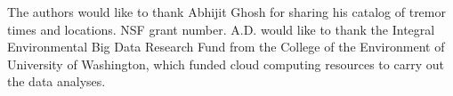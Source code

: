 \documentclass[draft]{agujournal2019}
\begin{document}
%
%
%
%
%
%
%
%


\acknowledgments
The authors would like to thank Abhijit Ghosh for sharing his catalog of tremor times and locations. NSF grant number. A.D. would like to thank the Integral Environmental Big Data Research Fund from the College of the Environment of University of Washington, which funded cloud computing resources to carry out the data analyses.



%
%





%
%
%
%
%
\end{document}
